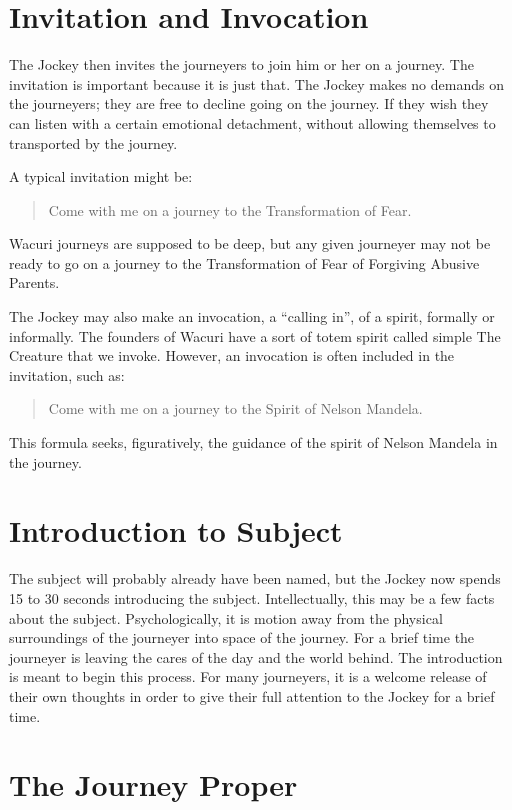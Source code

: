 \documentclass[12pt]{book}
\begin{document}
\section{ Invitation and Invocation}
The Jockey then invites the journeyers to join him or her on a journey.
The invitation is important because it is just that. The Jockey
makes no demands on the journeyers; they are free to decline going on the
journey. If they wish they can listen with a certain emotional detachment,
without allowing themselves to transported by the journey.

A typical invitation might be:
\begin{quote}
  Come with me on a journey to the Transformation of Fear.
\end{quote}
Wacuri journeys are supposed to be deep, but any given journeyer
may not be ready to go on a journey to the Transformation of Fear
of Forgiving Abusive Parents.

The Jockey may also make an invocation, a ``calling in'', of a spirit,
formally or informally. The founders of Wacuri have a sort of totem
spirit called simple The Creature that we invoke. However, an
invocation is often included in the invitation, such as:
\begin{quote}
  Come with me on a journey to the Spirit of Nelson Mandela.
\end{quote}
This formula seeks, figuratively, the guidance of the spirit of
Nelson Mandela in the journey.

\section{ Introduction to Subject}

The subject will probably already have been named, but the
Jockey now spends 15 to 30 seconds introducing the subject. Intellectually,
this may be a few facts about the subject. Psychologically, it is
motion away from the physical surroundings of the journeyer into
space of the journey. For a brief time the journeyer is leaving
the cares of the day and the world behind. The introduction is
meant to begin this process. For many journeyers, it is a welcome
release of their own thoughts in order to give their full attention
to the Jockey for a brief time.

\section{ The Journey Proper}
\end{document}
